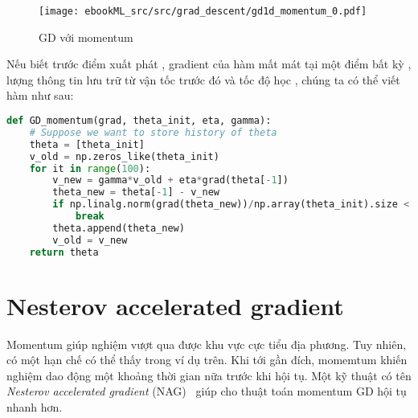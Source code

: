 \begin{figure}[t]
\centering
    \texttt{[image: ebookML\_src/src/grad\_descent/gd1d\_momentum\_0.pdf]}
    \caption[]{GD với momentum}
    \label{fig:8_momen}
\end{figure}

 
 
 
Nếu biết trước điểm xuất phát , gradient của hàm mất mát tại
một điểm bất kỳ , lượng thông tin lưu trữ từ vận tốc
trước đó  và tốc độ học , chúng ta có thể
viết hàm  như sau:%
\newpage 
\begin{lstlisting}[language=Python]
def GD_momentum(grad, theta_init, eta, gamma):
    # Suppose we want to store history of theta
    theta = [theta_init]
    v_old = np.zeros_like(theta_init)
    for it in range(100):
        v_new = gamma*v_old + eta*grad(theta[-1])
        theta_new = theta[-1] - v_new
        if np.linalg.norm(grad(theta_new))/np.array(theta_init).size < 1e-3:
            break
        theta.append(theta_new)
        v_old = v_new
    return theta 
\end{lstlisting}
 
 
\section{Nesterov accelerated gradient}
Momentum giúp nghiệm vượt qua được khu vực cực tiểu địa phương. Tuy nhiên, có
một hạn chế có thể thấy trong ví dụ trên. Khi tới gần đích, momemtum khiến
nghiệm dao động một khoảng thời gian nữa trước khi hội tụ. Một kỹ thuật có tên
\textit{Nesterov accelerated gradient} (NAG)~\cite{nesterov2007gradient} giúp
cho thuật toán momentum GD hội tụ nhanh hơn.
 
